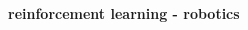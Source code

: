 \documentclass{beamer}
\begin{document}
\begin{frame}{\bf reinforcement learning - robotics}
\begin{columns}
    \begin{column}{0.5\textwidth}
    \end{column}


  \end{columns}

\end{frame}
\end{document}
